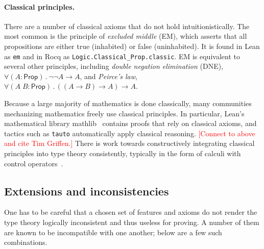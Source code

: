\documentclass{article}
\newcommand{\note}[1]{\textcolor{red}{[#1]}}
\newcommand{\kw}[1]{\mathsf{#1}}
\newcommand{\code}[1]{\texttt{#1}}
\begin{document}
\paragraph{Classical principles.}
There are a number of classical axioms that do not hold intuitionistically.
The most common is the principle of \emph{excluded middle} (EM),
which asserts that all propositions are either true (inhabited) or false (uninhabited).
It is found in Lean as \code{em} and in Rocq as \code{Logic.Classical\_Prop.classic}.
EM is equivalent to several other principles,
including \emph{double negation elimination} (DNE),
$\forall (A : \kw{Prop})\mathpunct{.} \neg \neg A \to A$,
and \emph{Peirce's law},
$\forall (A \; B : \kw{Prop})\mathpunct{.} ((A \to B) \to A) \to A$.

Because a large majority of mathematics is done classically,
many communities mechanizing mathematics freely use classical principles.
In particular, Lean's mathematical library mathlib~\citep{mathlib}
contains proofs that rely on classical axioms,
and tactics such as \code{tauto} automatically apply classical reasoning.
\note{Connect to above and cite Tim Griffen.}
There is work towards constructively integrating classical principles into type theory consistently,
typically in the form of calculi with control operators~\citep{mu,mumu,dl,sr}.

\subsection{Extensions and inconsistencies}

One has to be careful that a chosen set of features and axioms
do not render the type theory logically inconsistent and thus useless for proving.
A number of them are known to be incompatible with one another;
below are a few such combinations.
\end{document}
